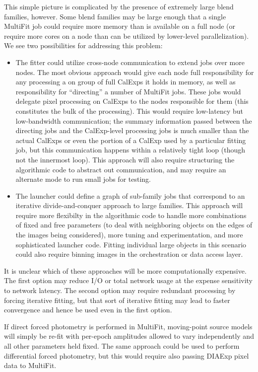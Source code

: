 This simple picture is complicated by the presence of extremely large blend families, however.  Some blend families may be large enough that a single MultiFit job could require more memory than is available on a full node (or require more cores on a node than can be utilized by lower-level parallelization).  We see two possibilities for addressing this problem:
\begin{itemize}
\item The fitter could utilize cross-node communication to extend jobs over more nodes.  The most obvious approach would give each node full responsibility for any processing a on group of full CalExps it holds in memory, as well as responsibility for ``directing'' a number of MultiFit jobs.  These jobs would delegate pixel processing on CalExps to the nodes responsible for them (this constitutes the bulk of the processing).  This would require low-latency but low-bandwidth communication; the summary information passed between the directing jobs and the CalExp-level processing jobs is much smaller than the actual CalExps or even the portion of a CalExp used by a particular fitting job, but this communication happens within a relatively tight loop (though not the innermost loop).  This approach will also require structuring the algorithmic code to abstract out communication, and may require an alternate mode to run small jobs for testing.
\item The launcher could define a graph of sub-family jobs that correspond to an iterative divide-and-conquer approach to large families.  This approach will require more flexibilty in the algorithmic code to handle more combinations of fixed and free parameters (to deal with neighboring objects on the edges of the images being considered), more tuning and experimentation, and more sophisticated launcher code.  Fitting individual large objects in this scenario could also require binning images in the orchestration or data access layer.
\end{itemize}
It is unclear which of these approaches will be more computationally expensive.  The first option may reduce I/O or total network usage at the expense sensitivity to network latency.  The second option may require redundant processing by forcing iterative fitting, but that sort of iterative fitting may lead to faster convergence and hence be used even in the first option.

If direct forced photometry is performed in MultiFit, moving-point source models will simply be re-fit with per-epoch amplitudes allowed to vary independently and all other parameters held fixed.  The same approach could be used to perform differential forced photometry, but this would require also passing DIAExp pixel data to MultiFit.

